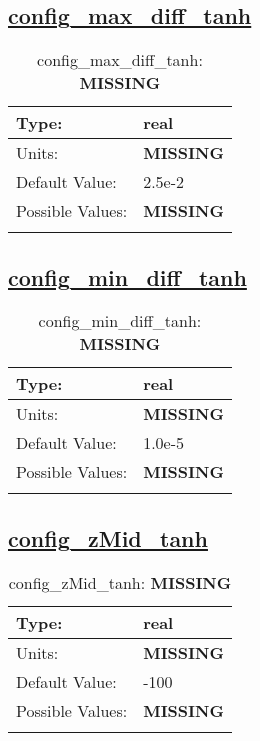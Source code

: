 \subsection[config\_max\_diff\_tanh]{\hyperref[sec:nm_tab_vmix_tanh]{config\_max\_diff\_tanh}}
\label{subsec:nm_sec_config_max_diff_tanh}
\begin{center}
\begin{longtable}{| p{2.0in} | p{4.0in} |}
    \hline
    Type: & real \\
    \hline
    Units: & {\bf \color{red} MISSING} \\
    \hline
    Default Value: & 2.5e-2 \\
    \hline
    Possible Values: & {\bf \color{red} MISSING} \\
    \hline
    \caption{config\_max\_diff\_tanh: {\bf \color{red} MISSING}}
\end{longtable}
\end{center}
\subsection[config\_min\_diff\_tanh]{\hyperref[sec:nm_tab_vmix_tanh]{config\_min\_diff\_tanh}}
\label{subsec:nm_sec_config_min_diff_tanh}
\begin{center}
\begin{longtable}{| p{2.0in} | p{4.0in} |}
    \hline
    Type: & real \\
    \hline
    Units: & {\bf \color{red} MISSING} \\
    \hline
    Default Value: & 1.0e-5 \\
    \hline
    Possible Values: & {\bf \color{red} MISSING} \\
    \hline
    \caption{config\_min\_diff\_tanh: {\bf \color{red} MISSING}}
\end{longtable}
\end{center}
\subsection[config\_zMid\_tanh]{\hyperref[sec:nm_tab_vmix_tanh]{config\_zMid\_tanh}}
\label{subsec:nm_sec_config_zMid_tanh}
\begin{center}
\begin{longtable}{| p{2.0in} | p{4.0in} |}
    \hline
    Type: & real \\
    \hline
    Units: & {\bf \color{red} MISSING} \\
    \hline
    Default Value: & -100 \\
    \hline
    Possible Values: & {\bf \color{red} MISSING} \\
    \hline
    \caption{config\_zMid\_tanh: {\bf \color{red} MISSING}}
\end{longtable}
\end{center}
